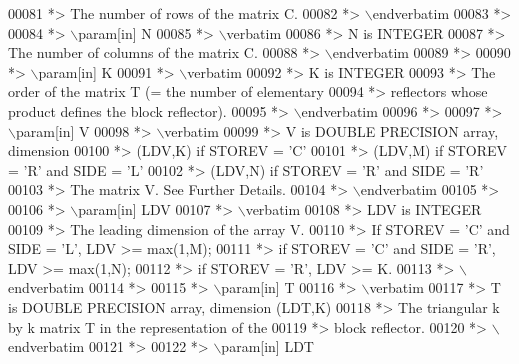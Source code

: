 \begin{DoxyCode}
00081 \textcolor{comment}{*>          The number of rows of the matrix C.}
00082 \textcolor{comment}{*> \(\backslash\)endverbatim}
00083 \textcolor{comment}{*>}
00084 \textcolor{comment}{*> \(\backslash\)param[in] N}
00085 \textcolor{comment}{*> \(\backslash\)verbatim}
00086 \textcolor{comment}{*>          N is INTEGER}
00087 \textcolor{comment}{*>          The number of columns of the matrix C.}
00088 \textcolor{comment}{*> \(\backslash\)endverbatim}
00089 \textcolor{comment}{*>}
00090 \textcolor{comment}{*> \(\backslash\)param[in] K}
00091 \textcolor{comment}{*> \(\backslash\)verbatim}
00092 \textcolor{comment}{*>          K is INTEGER}
00093 \textcolor{comment}{*>          The order of the matrix T (= the number of elementary}
00094 \textcolor{comment}{*>          reflectors whose product defines the block reflector).}
00095 \textcolor{comment}{*> \(\backslash\)endverbatim}
00096 \textcolor{comment}{*>}
00097 \textcolor{comment}{*> \(\backslash\)param[in] V}
00098 \textcolor{comment}{*> \(\backslash\)verbatim}
00099 \textcolor{comment}{*>          V is DOUBLE PRECISION array, dimension}
00100 \textcolor{comment}{*>                                (LDV,K) if STOREV = 'C'}
00101 \textcolor{comment}{*>                                (LDV,M) if STOREV = 'R' and SIDE = 'L'}
00102 \textcolor{comment}{*>                                (LDV,N) if STOREV = 'R' and SIDE = 'R'}
00103 \textcolor{comment}{*>          The matrix V. See Further Details.}
00104 \textcolor{comment}{*> \(\backslash\)endverbatim}
00105 \textcolor{comment}{*>}
00106 \textcolor{comment}{*> \(\backslash\)param[in] LDV}
00107 \textcolor{comment}{*> \(\backslash\)verbatim}
00108 \textcolor{comment}{*>          LDV is INTEGER}
00109 \textcolor{comment}{*>          The leading dimension of the array V.}
00110 \textcolor{comment}{*>          If STOREV = 'C' and SIDE = 'L', LDV >= max(1,M);}
00111 \textcolor{comment}{*>          if STOREV = 'C' and SIDE = 'R', LDV >= max(1,N);}
00112 \textcolor{comment}{*>          if STOREV = 'R', LDV >= K.}
00113 \textcolor{comment}{*> \(\backslash\)endverbatim}
00114 \textcolor{comment}{*>}
00115 \textcolor{comment}{*> \(\backslash\)param[in] T}
00116 \textcolor{comment}{*> \(\backslash\)verbatim}
00117 \textcolor{comment}{*>          T is DOUBLE PRECISION array, dimension (LDT,K)}
00118 \textcolor{comment}{*>          The triangular k by k matrix T in the representation of the}
00119 \textcolor{comment}{*>          block reflector.}
00120 \textcolor{comment}{*> \(\backslash\)endverbatim}
00121 \textcolor{comment}{*>}
00122 \textcolor{comment}{*> \(\backslash\)param[in] LDT}

\end{DoxyCode}
